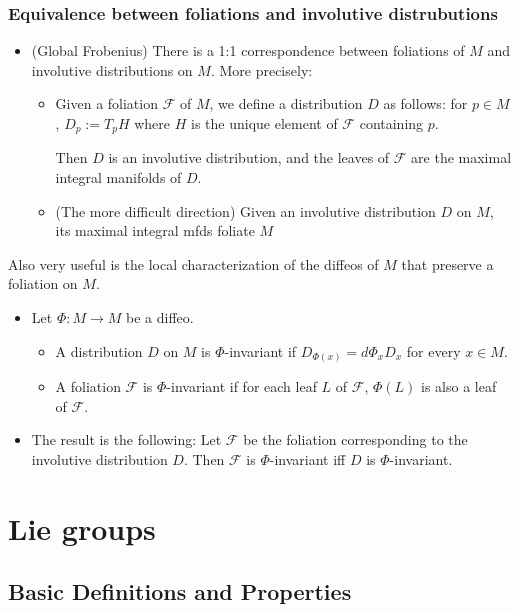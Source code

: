 \documentclass{report}
\theoremstyle{definition}
\begin{document}
\subsection{Equivalence between foliations and involutive distrubutions}

\begin{itemize}
    \item (Global Frobenius) There is a 1:1 correspondence between foliations of $M$ and involutive distributions on $M$. More precisely:
    \begin{itemize}
        \item Given a foliation $\mathcal{F}$ of $M$, we define a distribution $D$ as follows: for $p\in M$, $D_p:=T_pH$ where $H$ is the unique element of $\mathcal{F}$ containing $p$.

        Then $D$ is an involutive distribution, and the leaves of $\mathcal{F}$ are the maximal integral manifolds of $D$.
        \item (The more difficult direction) Given an involutive distribution $D$ on $M$, its maximal integral mfds foliate $M$
    \end{itemize}
\end{itemize}

Also very useful is the local characterization of the diffeos of $M$ that preserve a foliation on $M$.
\begin{itemize}
    \item Let $\Phi:M\to M$ be a diffeo.
    \begin{itemize}
        \item A distribution $D$ on $M$ is $\Phi$-invariant if $D_{\Phi(x)}=d\Phi_xD_x$ for every $x\in M$.
        \item A foliation $\mathcal{F}$ is $\Phi$-invariant if for each leaf $L$ of $\mathcal{F}$, $\Phi(L)$ is also a leaf of $\mathcal{F}$.
    \end{itemize}
    \item The result is the following: Let $\mathcal{F}$ be the foliation corresponding to the involutive distribution $D$. Then $\mathcal{F}$ is $\Phi$-invariant iff $D$ is $\Phi$-invariant.
\end{itemize}



\chapter{Lie groups}

\section{Basic Definitions and Properties}
\end{document}
